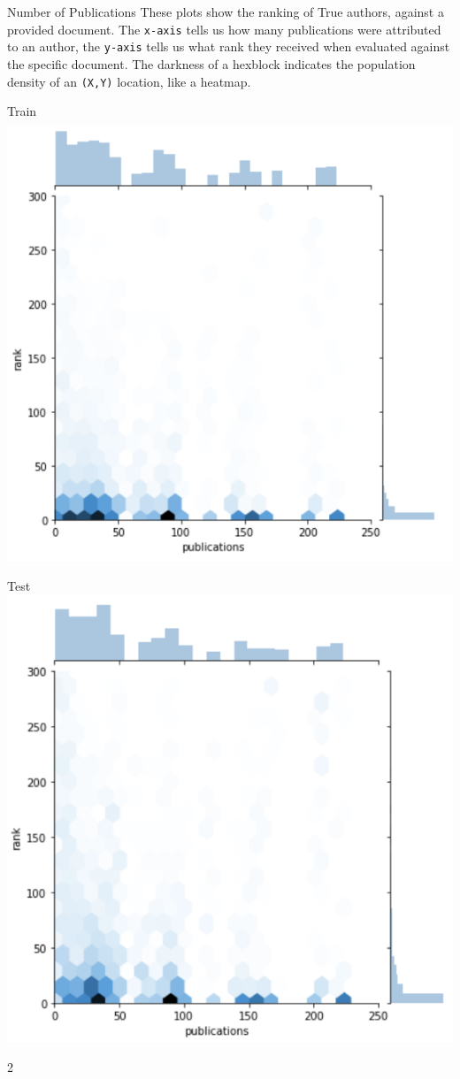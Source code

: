 \documentclass[10pt]{beamer}
\begin{document}
\begin{frame}{Number of Publications}
  These plots show the ranking of True authors, against a provided document. The \texttt{x-axis} tells us how many publications were attributed to an author, the \texttt{y-axis} tells us what rank they received when evaluated against the specific document. The darkness of a hexblock indicates the population density of an \texttt{(X,Y)} location, like a heatmap.

  \begin{multicols}{2}
    Train
    \includegraphics[width=.9\columnwidth]{./Train.png}

    Test
  \includegraphics[width=.9\columnwidth]{./Test.png}
  \end{multicols}{2}
\end{frame}
\end{document}
